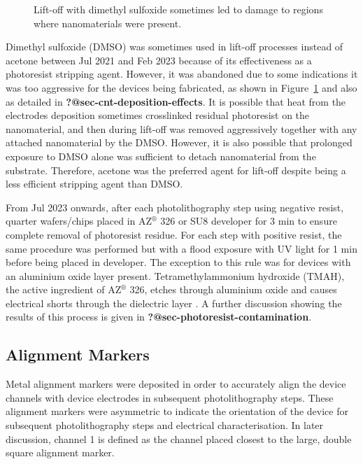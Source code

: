 \documentclass[
  a4paper,
]{scrbook}
\begin{document}
\begin{figure}
\begin{minipage}[t]{0.47\linewidth}
{{}

}

\end{minipage}%

\caption{\label{fig-dmso-damage}Lift-off with dimethyl sulfoxide
sometimes led to damage to regions where nanomaterials were present.}

\end{figure}

Dimethyl sulfoxide (DMSO) was sometimes used in lift-off processes
instead of acetone between Jul 2021 and Feb 2023 because of its
effectiveness as a photoresist stripping agent. However, it was
abandoned due to some indications it was too aggressive for the devices
being fabricated, as shown in Figure~\ref{fig-dmso-damage} and also as
detailed in \textbf{?@sec-cnt-deposition-effects}. It is possible that
heat from the electrodes deposition sometimes crosslinked residual
photoresist on the nanomaterial, and then during lift-off was removed
aggressively together with any attached nanomaterial by the DMSO.
However, it is also possible that prolonged exposure to DMSO alone was
sufficient to detach nanomaterial from the substrate. Therefore, acetone
was the preferred agent for lift-off despite being a less efficient
stripping agent than DMSO.

From Jul 2023 onwards, after each photolithography step using negative
resist, quarter wafers/chips placed in AZ\(^\circledR\) 326 or SU8
developer for 3 min to ensure complete removal of photoresist residue.
For each step with positive resist, the same procedure was performed but
with a flood exposure with UV light for 1 min before being placed in
developer. The exception to this rule was for devices with an aluminium
oxide layer present. Tetramethylammonium hydroxide (TMAH), the active
ingredient of AZ\(^\circledR\) 326, etches through aluminium oxide and
causes electrical shorts through the dielectric layer
\autocite{Oh2011,Ali2021}. A further discussion showing the results of
this process is given in \textbf{?@sec-photoresist-contamination}.

\hypertarget{sec-align}{%
\subsection{Alignment Markers}\label{sec-align}}

Metal alignment markers were deposited in order to accurately align the
device channels with device electrodes in subsequent photolithography
steps. These alignment markers were asymmetric to indicate the
orientation of the device for subsequent photolithography steps and
electrical characterisation. In later discussion, channel 1 is defined
as the channel placed closest to the large, double square alignment
marker.
\end{document}
